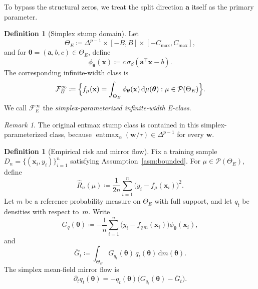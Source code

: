 \documentclass[11pt,a4paper]{article}
\theoremstyle{definition}
\newtheorem{definition}[theorem]{Definition}
\theoremstyle{remark}
\newtheorem{remark}[theorem]{Remark}
\newcommand{\vtheta}{\boldsymbol{\theta}}
\newcommand{\vw}{\mathbf{w}}
\newcommand{\vx}{\mathbf{x}}
\newcommand{\va}{\mathbf{a}}
\newcommand{\simplex}{\Delta^{p-1}}
\newcommand{\entmax}{\operatorname{entmax}}
\newcommand{\dd}{\mathrm{d}}
\newcommand{\dmu}{\dd\mu}
\begin{document}
To bypass the structural zeros, we treat the
split direction \(\va\) itself as the primary
parameter.

\begin{definition}[Simplex stump domain]
  \label{def:E-domain}
  Let
  \[
    \Theta_E
    \coloneqq
    \simplex \times [-B,B] \times [-C_{\max},C_{\max}],
  \]
  and for \(\vtheta=(\va,b,c)\in\Theta_E\),
  define
  \[
    \phi_{\vtheta}(\vx)
    \coloneqq
    c\,\sigma_\beta(\va^\top \vx - b).
  \]
  The corresponding infinite-width class is
  \[
    \mathcal{F}_E^\infty
    \coloneqq
    \Bigl\{
      f_\mu(\vx)
      =
      \int_{\Theta_E}\phi_{\vtheta}(\vx)\,\dmu(\vtheta)
      :
      \mu \in \mathcal{P}(\Theta_E)
    \Bigr\}.
  \]
  We call \(\mathcal{F}_E^\infty\) the
  \emph{simplex-parameterized infinite-width
  E-class}.
\end{definition}

\begin{remark}
  The original entmax stump class is contained in
  this simplex-parameterized class, because
  \(\entmax_\alpha(\vw/\tau)\in\simplex\) for
  every \(\vw\).
\end{remark}

\begin{definition}[Empirical risk and mirror flow]
  \label{def:E-flow}
  Fix a training sample
  \(D_n=\{(\vx_i,y_i)\}_{i=1}^n\)
  satisfying Assumption~\ref{asm:bounded}.
  For \(\mu \in \mathcal{P}(\Theta_E)\), define
  \[
    \hat R_n(\mu)
    \coloneqq
    \frac{1}{2n}
    \sum_{i=1}^n
    \bigl(
      y_i - f_\mu(\vx_i)
    \bigr)^2.
  \]
  Let \(m\) be a reference probability measure on
  \(\Theta_E\) with full support, and let
  \(q_t\) be densities with respect to~\(m\).
  Write
  \[
    G_q(\vtheta)
    \coloneqq
    -\frac{1}{n}
    \sum_{i=1}^n
    \bigl(
      y_i - f_{q\,m}(\vx_i)
    \bigr)\phi_{\vtheta}(\vx_i),
  \]
  and
  \[
    \overline G_t
    \coloneqq
    \int_{\Theta_E}
    G_{q_t}(\vtheta)\,q_t(\vtheta)\,\dd m(\vtheta).
  \]
  The simplex mean-field mirror flow is
  \begin{equation}
    \partial_t q_t(\vtheta)
    =
    -q_t(\vtheta)
    \bigl(
      G_{q_t}(\vtheta)-\overline G_t
    \bigr).
    \label{eq:E-mirror}
  \end{equation}
\end{definition}
\end{document}
